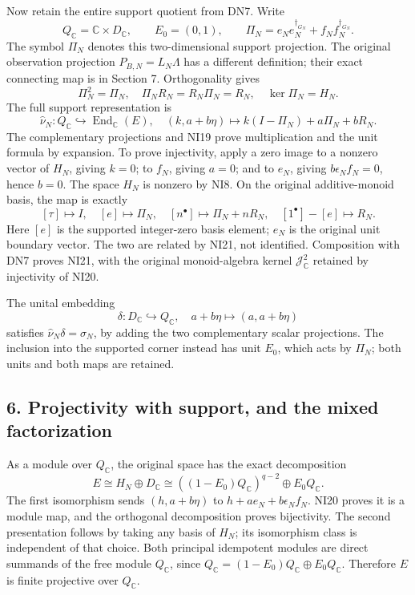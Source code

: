 \documentclass[
]{article}
\begin{document}
Now retain the entire support quotient from DN7. Write \[
Q_{\mathbb C}=\mathbb C\times D_{\mathbb C},\qquad
E_0=(0,1),\qquad
\Pi_N=e_Ne_N^{\dagger_{G_N}}+f_Nf_N^{\dagger_{G_N}}.
\] The symbol \(\Pi_N\) denotes this two-dimensional support projection.
The original observation projection \(P_{B,N}=L_N\Lambda\) has a
different definition; their exact connecting map is in Section 7.
Orthogonality gives \[
\Pi_N^2=\Pi_N,\quad\Pi_NR_N=R_N\Pi_N=R_N,
\quad\ker\Pi_N=H_N.
\tag{NI19}
\] The full support representation is \[
\widehat\nu_N:Q_{\mathbb C}\hookrightarrow\operatorname{End}_{\mathbb C}(E),
\quad (k,a+b\eta)\longmapsto k(I-\Pi_N)+a\Pi_N+bR_N.
\tag{NI20}
\] The complementary projections and NI19 prove multiplication and the
unit formula by expansion. To prove injectivity, apply a zero image to a
nonzero vector of \(H_N\), giving \(k=0\); to \(f_N\), giving \(a=0\);
and to \(e_N\), giving \(b\epsilon_Nf_N=0\), hence \(b=0\). The space
\(H_N\) is nonzero by NI8. On the original additive-monoid basis, the
map is exactly \[
[\tau]\longmapsto I,\quad [e]\longmapsto\Pi_N,\quad
[n^\bullet]\longmapsto\Pi_N+nR_N,\quad
[1^\bullet]-[e]\longmapsto R_N.
\tag{NI21}
\] Here \([e]\) is the supported integer-zero basis element; \(e_N\) is
the original unit boundary vector. The two are related by NI21, not
identified. Composition with DN7 proves NI21, with the original
monoid-algebra kernel \(\mathcal J_{\mathbb C}^2\) retained by
injectivity of NI20.

The unital embedding \[
\delta:D_{\mathbb C}\hookrightarrow Q_{\mathbb C},
\quad a+b\eta\longmapsto(a,a+b\eta)
\tag{NI22}
\] satisfies \(\widehat\nu_N\delta=\sigma_N\), by adding the two
complementary scalar projections. The inclusion into the supported
corner instead has unit \(E_0\), which acts by \(\Pi_N\); both units and
both maps are retained.

\subsection{6. Projectivity with support, and the mixed
factorization}\label{projectivity-with-support-and-the-mixed-factorization}

As a module over \(Q_{\mathbb C}\), the original space has the exact
decomposition \[
E\cong H_N\oplus D_{\mathbb C}
\cong ((1-E_0)Q_{\mathbb C})^{q-2}\oplus E_0Q_{\mathbb C}.
\tag{NI23}
\] The first isomorphism sends \((h,a+b\eta)\) to
\(h+ae_N+b\epsilon_Nf_N\). NI20 proves it is a module map, and the
orthogonal decomposition proves bijectivity. The second presentation
follows by taking any basis of \(H_N\); its isomorphism class is
independent of that choice. Both principal idempotent modules are direct
summands of the free module \(Q_{\mathbb C}\), since
\(Q_{\mathbb C}=(1-E_0)Q_{\mathbb C}\oplus E_0Q_{\mathbb C}\). Therefore
\(E\) is finite projective over \(Q_{\mathbb C}\).
\end{document}

